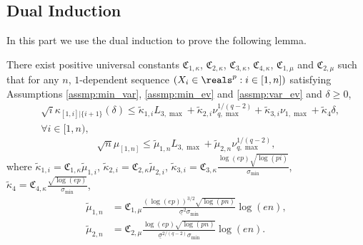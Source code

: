 \documentclass[aos]{imsart}
\begin{document}
\medskip

\subsection{Dual Induction} \label{sec:dual_indcution_3N} 
In this part we use the dual induction to prove the following lemma.
\begin{lemma}
    There exist positive universal constants $\mathfrak{C}_{1,\kappa}$, $\mathfrak{C}_{2,\kappa}$, $\mathfrak{C}_{3,\kappa}$, $\mathfrak{C}_{4,\kappa}$, $\mathfrak{C}_{1,\mu}$ and $\mathfrak{C}_{2,\mu}$ such that for any $n$, $1$-dependent sequence $(X_i \in \reals^p: i \in [1,n])$ satisfying Assumptions \eqref{assmp:min_var}, \eqref{assmp:min_ev} and \eqref{assmp:var_ev} and $\delta \geq 0$,
    \begin{equation} \label{eq:hypothesis_AC_3N} \tag{HYP-AC-1}
    \begin{aligned}
        & \sqrt{i} \kappa_{[1,i]|\{i+1\}}(\delta)
        \leq 
        \tilde\kappa_{1,i} {L}_{3,\max}
        + \tilde\kappa_{2,i} \nu_{q,\max}^{1/(q-2)}
        + \tilde\kappa_{3,i} \nu_{1,\max}
        + \tilde\kappa_{4} \delta, \\
        & \forall i \in [1,n),
    \end{aligned}
    \end{equation}
    \begin{equation} \label{eq:hypothesis_BE_3N} \tag{HYP-BE-1}
        \sqrt{n} \mu_{[1,n]}
        \leq \tilde\mu_{1,n} {L}_{3,\max}
        + \tilde\mu_{2,n} \nu_{q,\max}^{1/(q-2)},
    \end{equation}
    where $\tilde\kappa_{1,i} = \mathfrak{C}_{1,\kappa} \tilde\mu_{1,i}$, 
    $\tilde\kappa_{2,i} = \mathfrak{C}_{2,\kappa} \tilde\mu_{2,i}$, 
    $\tilde\kappa_{3,i} = \mathfrak{C}_{3,\kappa} \frac{\log(ep)\sqrt{\log(pi)}}{\sigma_{\min}}$,
    $\tilde\kappa_{4} = \mathfrak{C}_{4,\kappa} \frac{\sqrt{\log(ep)}}{\sigma_{\min}}$,
    \begin{equation*}
    \begin{aligned}
        \tilde\mu_{1,n} 
        & = \mathfrak{C}_{1,\mu} \frac{(\log(ep))^{3/2}\sqrt{\log(pn)}}{\underline\sigma^2\sigma_{\min}} \log\left(e n\right), \\
        \tilde\mu_{2,n}
        & = \mathfrak{C}_{2,\mu} \frac{\log(ep)\sqrt{\log(pn)}}{\underline\sigma^{2/(q-2)} \sigma_{\min}} \log\left(e n\right).
    \end{aligned}
    \end{equation*}
\end{lemma}
\end{document}
